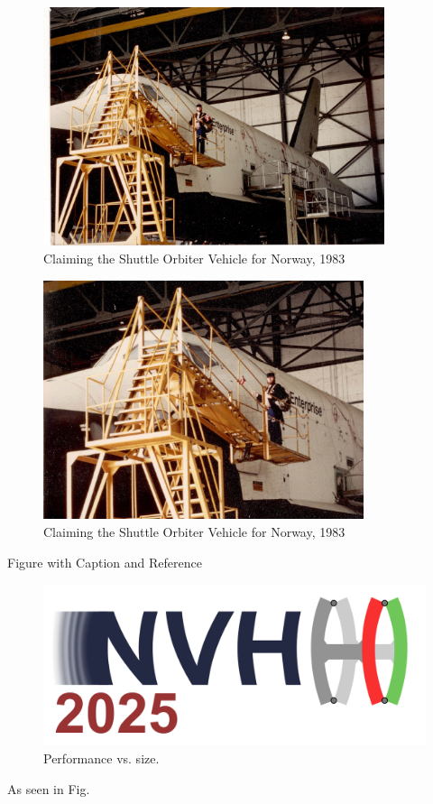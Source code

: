 \documentclass[aspectratio=169,10pt]{beamer} \mode<presentation>
\begin{document}
\begin{frame}
  \begin{figure}
    \centering
    \includegraphics[width=0.65\linewidth,height=7cm]{Shuttle-1983}
    \caption{Claiming the Shuttle Orbiter Vehicle for Norway, 1983}
  \end{figure}
\end{frame}

\begin{frame}
  \begin{figure}
    \centering
    \includegraphics[width=0.65\linewidth,height=7cm]{Shuttle-1983-1}
    \caption{Claiming the Shuttle Orbiter Vehicle for Norway, 1983}
  \end{figure}
\end{frame}
\begin{frame}{Figure with Caption and Reference}
\begin{figure}
  \centering
  \includegraphics[width=0.7\linewidth]{logo.png}
  \caption{Performance vs. size.}
  \label{fig:perf}
\end{figure}
As seen in Fig.%
\end{frame}
\end{document}
